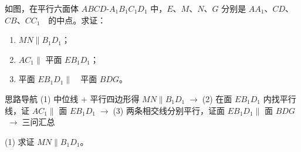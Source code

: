\documentclass{exam-zh}
\begin{document}
\begin{eduProblemBlock}[例题 4]
\noindent
\begin{minipage}[t]{\dimexpr\linewidth-70mm-6mm\relax}
\vspace{0pt}
如图，在平行六面体 $ABCD$-$A_{1}B_{1}C_{1}D_{1}$ 中，$E$、$M$、$N$、$G$ 分别是 $AA_{1}$、$CD$、$CB$、$CC_{1}$\ \ 的中点。求证：
\begin{enumerate}[label=(\arabic*)]
  \item $MN\parallel B_{1}D_{1}$；
\ \  \item $AC_{1}\parallel$ 平面 $EB_{1}D_{1}$；
  \item 平面 $EB_{1}D_{1}\parallel$\ \ 平面 $BDG$。
\end{enumerate}

\end{minipage}\hfill
\begin{diagramcoltikz}{70mm}{平行六面体四个中点，(1)(2)(3) 三问分别对应线线、线面、面面三层。}
}
\end{diagramcoltikz}
\end{eduProblemBlock}





\begin{eduAuxItem}{思路导航}
(1) 中位线 + 平行四边形得 $MN\parallel B_{1}D_{1}$$\;\to\;$(2) 在面 $EB_{1}D_{1}$ 内找平行线，证 $AC_{1}\parallel$ 面 $EB_{1}D_{1}$$\;\to\;$(3) 两条相交线分别平行，证面 $EB_{1}D_{1}\parallel$ 面 $BDG$$\;\to\;$三问汇总\end{eduAuxItem}




\begin{eduSubQuestionItem}{(1)}
求证 $MN\parallel B_{1}D_{1}$。\end{eduSubQuestionItem}
\end{document}

